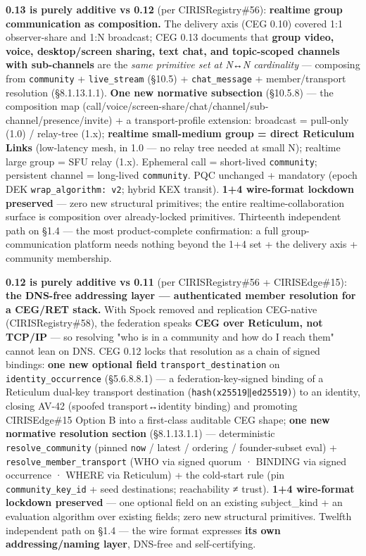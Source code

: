 \documentclass[10pt]{article}
\begin{document}
\textbf{0.13 is purely additive vs 0.12} (per CIRISRegistry\#56): \textbf{realtime group communication as composition.} The delivery axis (CEG 0.10) covered 1:1 observer-share and 1:N broadcast; CEG 0.13 documents that \textbf{group video, voice, desktop/screen sharing, text chat, and topic-scoped channels with sub-channels} are the \textit{same primitive set at N↔N cardinality} — composing from \texttt{community} + \texttt{live\_stream} (§10.5) + \texttt{chat\_message} + member/transport resolution (§8.1.13.1.1). \textbf{One new normative subsection} (§10.5.8) — the composition map (call/voice/screen-share/chat/channel/sub-channel/presence/invite) + a transport-profile extension: broadcast = pull-only (1.0) / relay-tree (1.x); \textbf{realtime small-medium group = direct Reticulum Links} (low-latency mesh, in 1.0 — no relay tree needed at small N); realtime large group = SFU relay (1.x). Ephemeral call = short-lived \texttt{community}; persistent channel = long-lived \texttt{community}. PQC unchanged + mandatory (epoch DEK \texttt{wrap\_algorithm: v2}; hybrid KEX transit). \textbf{1+4 wire-format lockdown preserved} — zero new structural primitives; the entire realtime-collaboration surface is composition over already-locked primitives. Thirteenth independent path on §1.4 — the most product-complete confirmation: a full group-communication platform needs nothing beyond the 1+4 set + the delivery axis + community membership.


\textbf{0.12 is purely additive vs 0.11} (per CIRISRegistry\#56 + CIRISEdge\#15): \textbf{the DNS-free addressing layer — authenticated member resolution for a CEG/RET stack.} With Spock removed and replication CEG-native (CIRISRegistry\#58), the federation speaks \textbf{CEG over Reticulum, not TCP/IP} — so resolving "who is in a community and how do I reach them" cannot lean on DNS. CEG 0.12 locks that resolution as a chain of signed bindings: \textbf{one new optional field} \texttt{transport\_destination} on \texttt{identity\_occurrence} (§5.6.8.8.1) — a federation-key-signed binding of a Reticulum dual-key transport destination (\texttt{hash(x25519‖ed25519)}) to an identity, closing AV-42 (spoofed transport↔identity binding) and promoting CIRISEdge\#15 Option B into a first-class auditable CEG shape; \textbf{one new normative resolution section} (§8.1.13.1.1) — deterministic \texttt{resolve\_community} (pinned \texttt{now} / latest / ordering / founder-subset eval) + \texttt{resolve\_member\_transport} (WHO via signed quorum · BINDING via signed occurrence · WHERE via Reticulum) + the cold-start rule (pin \texttt{community\_key\_id} + seed destinations; reachability ≠ trust). \textbf{1+4 wire-format lockdown preserved} — one optional field on an existing subject\_kind + an evaluation algorithm over existing fields; zero new structural primitives. Twelfth independent path on §1.4 — the wire format expresses \textbf{its own addressing/naming layer}, DNS-free and self-certifying.
\end{document}
